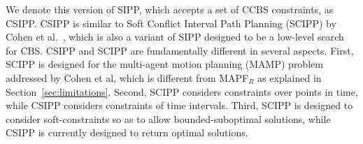 \documentclass[review]{elsarticle}
\newcommand{\tuple}[1]{\ensuremath{\left \langle #1 \right \rangle }}
\newcommand\konstantin[1]{\nb{\textbf{Konstantin:}}{red}{#1}}
\newcommand\roni[1]{\nb{\textbf{Roni:}}{green}{#1}}
\newcommand{\ccbs}{\ac{CCBS}\xspace}
\newcommand{\cbs}{\ac{CBS}\xspace}
\newcommand{\sipp}{\ac{SIPP}\xspace}
\newcommand{\csipp}{\ac{CSIPP}\xspace}
\newcommand{\mapfr}{\ac{MAPF}$_R$\xspace}
\begin{document}
We denote this version of \sipp, which accepts a set of \ccbs constraints, as \csipp. \csipp is similar to Soft Conflict Interval Path Planning (SCIPP) by Cohen et al.~\cite{cohen2019optimal}, which is also a variant of \sipp designed to be a low-level search for \cbs.
\csipp and SCIPP are fundamentally different in several aspects. First, SCIPP is designed for the multi-agent motion planning (MAMP) problem addressed by Cohen et al, which is different from \mapfr as explained in Section~\ref{sec:limitations}. 
Second, SCIPP considers constraints over points in time, while CSIPP considers constraints of time intervals. 
Third, SCIPP is designed to consider soft-constraints so as to allow bounded-suboptimal solutions, while \csipp is currently designed to return optimal solutions. 





\end{document}
